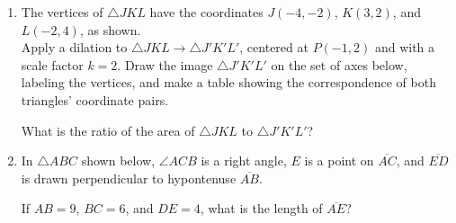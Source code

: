 \documentclass[12pt, twoside]{article}
\begin{document}
\begin{enumerate}
\item The vertices of $\triangle JKL$ have the coordinates $J(-4,-2)$, $K(3,2)$, and $L(-2,4)$, as shown. \\[0.25cm]
    Apply a dilation to $\triangle JKL \rightarrow \triangle J'K'L'$, centered at $P(-1,2)$ and with a scale factor $k=2$. Draw the image $\triangle J'K'L'$ on the set of axes below, labeling the vertices, and make a table showing the correspondence of both triangles' coordinate pairs.
      \begin{flushright}
      \end{flushright}
      What is the ratio of the area of $\triangle JKL$ to $\triangle J'K'L'$?

\newpage
\item In $\triangle ABC$ shown below, $\angle ACB$ is a right angle, $E$ is a point on $\overline{AC}$, and $\overline{ED}$ is drawn perpendicular to hypontenuse $\overline{AB}$.
    \begin{center}
    \end{center} 
    If $AB = 9$, $BC = 6$, and $DE = 4$, what is the length of $\overline{AE}$? \vspace{3cm}


\end{enumerate}
\end{document}
